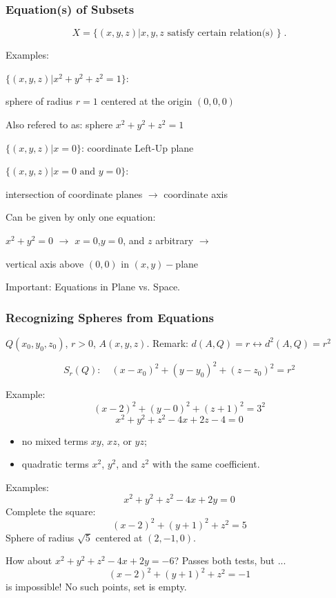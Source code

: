 \begin{frame}
 \frametitle{Equation(s) of Subsets}

  $$X = \{ (x,y,z) | x,y,z \text{ satisfy certain relation(s) } \} \; .$$

\pause
Examples:

$\{(x,y,z) | x^2+y^2+z^2 = 1\}$:

\pause
sphere of radius $r=1$ centered at the origin $(0,0,0)$

Also refered to as: sphere $x^2+y^2+z^2 = 1$

\pause
\medskip

$\{ (x,y,z) | x=0 \}$: coordinate Left-Up plane

\pause
\medskip

$\{ (x,y,z) | x=0 \text{ and } y=0 \}$:

intersection of coordinate planes $\rightarrow$ coordinate axis

\pause
\medskip

Can be given by only one equation:

$x^2+y^2 = 0$ $\rightarrow$ $x=0$,$y=0$, and $z$ arbitrary $\rightarrow$

vertical axis above $(0,0)$ in $(x,y)-$plane

\pause
\medskip

Important: Equations in Plane vs. Space.

\end{frame}

\begin{frame}
 \frametitle{Recognizing Spheres from Equations}

  $Q(x_0,y_0,z_0)$, $r>0$, $A(x,y,z)$. Remark: $d(A,Q) = r \longleftrightarrow d^2(A,Q) = r^2$

$$S_r(Q): \quad (x-x_0)^2+(y-y_0)^2+(z-z_0)^2 = r^2$$

\pause
Example:
$$(x-2)^2+(y-0)^2+(z+1)^2=3^2$$
%
$$x^2+y^2+z^2 -4x + 2z -4=0$$

\pause
\begin{itemize}
 \item no mixed terms $xy$, $xz$, or $yz$;
 \item quadratic terms $x^2$, $y^2$, and $z^2$ with the same coefficient.
\end{itemize}

\pause
Examples:
$$x^2+y^2+z^2-4x+2y=0$$
%
\pause
Complete the square:
%
$$(x-2)^2 + (y+1)^2 +z^2 = 5$$
%
Sphere of radius $\sqrt{5}$ centered at $(2,-1,0)$.

\pause
How about $x^2+y^2+z^2 - 4x+2y = -6$? \pause Passes both tests, but ...
%
$$(x-2)^2 + (y+1)^2 +z^2 = -1$$
%
is impossible! No such points, set is empty.

\end{frame}

